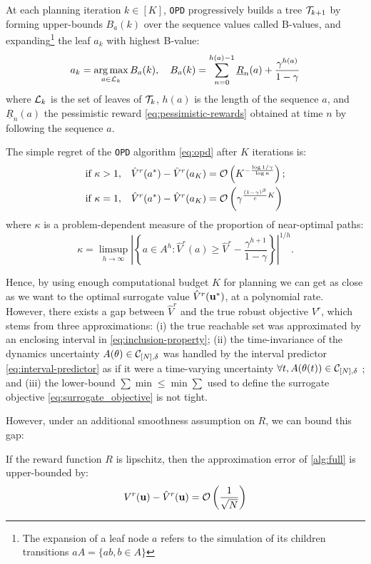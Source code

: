 \documentclass{article}
\begin{document}
At each planning iteration $k\in[K]$, \texttt{OPD} progressively builds a tree $\mathcal{T}_{k+1}$ by forming upper-bounds $B_a(k)$ over the sequence values called B-values, and expanding\footnote{The expansion of a leaf node $a$ refers to the simulation of its children transitions $aA = \{ab, b\in A\}$} the leaf $a_k$ with highest B-value:
\begin{equation}
\label{eq:opd}
a_k = \operatorname*{arg\,max}_{a\in\mathcal{L}_k} B_a(k), \quad B_a(k) = \sum_{n=0}^{h(a)-1} \underline{R}_n(a) + \frac{\gamma^{h(a)}}{1-\gamma}
\end{equation}
where $\mathcal{L}_k$ is the set of leaves of $\mathcal{T}_k$, $h(a)$ is the length of the sequence $a$, and $\underline{R}_n(a)$ the pessimistic reward \eqref{eq:pessimistic-rewards} obtained at time $n$ by following the sequence $a$.
\begin{theorem}
\label{theorem:opd-regret}
The simple regret of the \texttt{OPD} algorithm \eqref{eq:opd} after $K$ iterations is:
\begin{align*}
\text{if } \kappa>1,\quad& 
\hat{V}^r(a^*) - \hat{V}^r({a_K}) = \mathcal{O}\left(K^{-\frac{\log 1/\gamma}{\log \kappa}}\right);\\
\text{if }\kappa=1,\quad&
\hat{V}^r(a^*) - \hat{V}^r({a_K}) = \mathcal{O}\left(\gamma^{\frac{(1-\gamma)^\beta}{c}K}\right)
\end{align*}
where $\kappa$ is a problem-dependent measure of the proportion of near-optimal paths:
\[
\kappa = \limsup_{h\rightarrow\infty} \left|\left\{a\in A^h: \hat{V}^r(a)\geq \hat{V}^r - \frac{\gamma^{h+1}}{1-\gamma}\right\}\right|^{1/h}.
\]
\end{theorem}

Hence, by using enough computational budget $K$ for planning we can get as close as we want to the optimal surrogate value $\hat{V}^r(\mathbf{u}^*)$, at a polynomial rate. However, there exists a gap between $\hat{V}^r$ and the true robust objective $V^r$, which stems from three approximations: (i) the true reachable set was approximated by an enclosing interval in \eqref{eq:inclusion-property}; (ii) the time-invariance of the dynamics uncertainty $A(\theta)\in\mathcal{C}_{[N],\delta}$ was handled by the interval predictor \eqref{eq:interval-predictor} as if it were a time-varying uncertainty $\forall t, A(\theta(t))\in\mathcal{C}_{[N],\delta}$ ; and (iii) the lower-bound $\sum\min\leq \min\sum$ used to define the surrogate objective \eqref{eq:surrogate_objective} is not tight.

However, under an additional smoothness assumption on $R$, we can bound this gap:
\begin{theorem}
\label{thm:control-error}
If the reward function $R$ is lipschitz, then the approximation error of \autoref{alg:full} is upper-bounded by:
\begin{equation*}
     V^r(\mathbf{u}) - \hat{V}^r(\mathbf{u}) = \mathcal{O}\left(\frac{1}{\sqrt{N}}\right)
\end{equation*}
\end{theorem}
\end{document}
